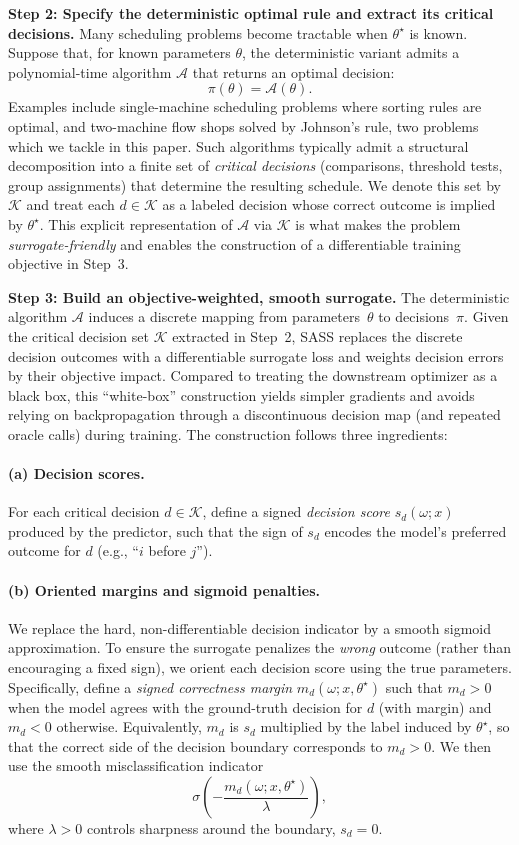 \documentclass{article}
\begin{document}
\noindent\textbf{Step 2: Specify the deterministic optimal rule and extract its critical decisions.}
Many scheduling problems become tractable when $\theta^\star$ is known.
Suppose that, for known parameters $\theta$, the deterministic variant admits a
polynomial-time algorithm $\mathcal{A}$ that returns an optimal decision:
\[
\pi(\theta) = \mathcal{A}(\theta).
\]
Examples include single-machine scheduling problems where sorting rules are optimal, and
two-machine flow shops solved by Johnson’s rule, two problems which we tackle in this paper.
Such algorithms typically admit a structural decomposition into a finite set of
\emph{critical decisions} (comparisons, threshold tests, group assignments) that determine the resulting schedule.
We denote this set by $\mathcal{K}$ and treat each $d\in\mathcal{K}$ as a labeled decision whose correct outcome is implied by $\theta^\star$.
This explicit representation of $\mathcal{A}$ via $\mathcal{K}$ is what makes the problem \emph{surrogate-friendly} and enables the construction of a differentiable training objective in Step~3.

\noindent\textbf{Step 3: Build an objective-weighted, smooth surrogate.}
The deterministic algorithm $\mathcal{A}$ induces a discrete mapping from
parameters~$\theta$ to decisions~$\pi$.
Given the critical decision set $\mathcal{K}$ extracted in Step~2, SASS replaces the discrete decision outcomes with a differentiable surrogate loss and weights decision errors by their objective impact.
Compared to treating the downstream optimizer as a black box, this ``white-box'' construction yields simpler gradients and avoids relying on backpropagation through a discontinuous decision map (and repeated oracle calls) during training.
The construction follows three ingredients:

\paragraph{(a) Decision scores.}
For each critical decision $d \in \mathcal{K}$, define a signed \emph{decision
score} $s_d(\omega;x)$ produced by the predictor, such that the sign of $s_d$
encodes the model's preferred outcome for $d$ (e.g., ``$i$ before $j$'').

\paragraph{(b) Oriented margins and sigmoid penalties.}
We replace the hard, non-differentiable decision indicator by a smooth sigmoid approximation.
To ensure the surrogate penalizes the \emph{wrong} outcome (rather than
encouraging a fixed sign), we orient each decision score using the true
parameters.
Specifically, define a \emph{signed correctness margin}
$m_d(\omega;x,\theta^\star)$ such that $m_d>0$ when the model agrees with the
ground-truth decision for $d$ (with margin) and $m_d<0$ otherwise.
Equivalently, $m_d$ is $s_d$ multiplied by the label induced by $\theta^\star$, so that the correct side of the decision boundary corresponds to $m_d>0$.
We then use the smooth misclassification indicator
\[
\sigma\!\left( -\frac{m_d(\omega;x,\theta^\star)}{\lambda} \right),
\]
where $\lambda>0$ controls sharpness around the boundary, $s_d=0$.
\end{document}
